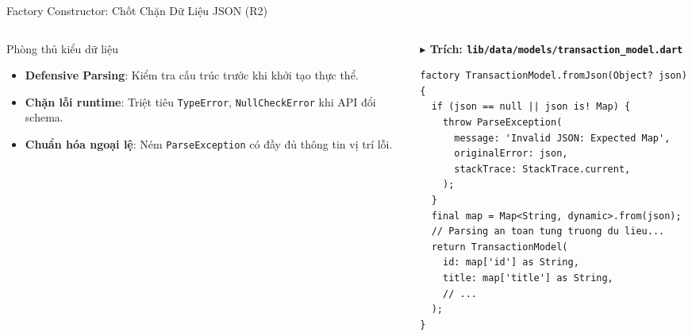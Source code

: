 \documentclass[aspectratio=169, 10pt]{beamer}
\newcommand{\speakerA}{\hfill\tcbox[colback=IndigoAccent,colframe=IndigoAccent,boxsep=1pt,left=3pt,right=3pt,top=1pt,bottom=1pt]{\tiny\bfseries\color{white}SV A: Nguyễn Đức Hải}}
\begin{document}
\begin{frame}[fragile]{Factory Constructor: Chốt Chặn Dữ Liệu JSON (R2) \speakerA}
  \begin{columns}[c]
    \begin{column}{0.46\textwidth}
      \begin{infobox}[RoseDanger]{Phòng thủ kiểu dữ liệu}
        \begin{itemize}\setlength{\itemsep}{3pt}\scriptsize
          \item \textbf{Defensive Parsing}: Kiểm tra cấu trúc trước khi khởi tạo thực thể.
          \item \textbf{Chặn lỗi runtime}: Triệt tiêu \texttt{TypeError}, \texttt{NullCheckError} khi API đổi schema.
          \item \textbf{Chuẩn hóa ngoại lệ}: Ném \texttt{ParseException} có đầy đủ thông tin vị trí lỗi.
        \end{itemize}
      \end{infobox}
    \end{column}

    \begin{column}{0.54\textwidth}
\vspace{1mm}
{\scriptsize\bfseries\color{NavyPrimary} $\blacktriangleright$ Trích: \texttt{lib/data/models/transaction_model.dart}}\\[1mm]
\begin{lstlisting}
factory TransactionModel.fromJson(Object? json) {
  if (json == null || json is! Map) {
    throw ParseException(
      message: 'Invalid JSON: Expected Map',
      originalError: json,
      stackTrace: StackTrace.current,
    );
  }
  final map = Map<String, dynamic>.from(json);
  // Parsing an toan tung truong du lieu...
  return TransactionModel(
    id: map['id'] as String,
    title: map['title'] as String,
    // ...
  );
}
\end{lstlisting}
    \end{column}
  \end{columns}
\end{frame}
\end{document}
